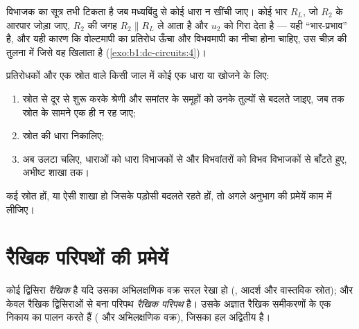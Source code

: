 \begin{remark}[विभाजक पर भार]\label{rem:b1:dc-circuits:loading}
विभाजक का सूत्र तभी टिकता है जब मध्यबिंदु से कोई धारा न खींची जाए।
कोई भार $R_L$, जो $R_2$ के आरपार जोड़ा जाए, $R_2$ की जगह $R_2
\parallel R_L$ ले आता है और $u_2$ को गिरा देता है --- यही ``भार-प्रभाव'' है,
और यही कारण कि वोल्टमापी का प्रतिरोध ऊँचा और विभवमापी का नीचा होना चाहिए, उस
चीज़ की तुलना में जिसे वह खिलाता है (\cref{exo:b1:dc-circuits:4})।
\end{remark}

\begin{method}[किसी जाल को समेटना]\label{met:b1:dc-circuits:reduce}
प्रतिरोधकों और एक स्रोत वाले किसी जाल में कोई एक धारा या  खोजने के
लिए:
\begin{enumerate}
  \item स्रोत से दूर से शुरू करके श्रेणी और समांतर के समूहों को उनके
        तुल्यों से बदलते जाइए, जब तक स्रोत के सामने एक ही  न रह
        जाए;
  \item स्रोत की धारा निकालिए;
  \item अब उलटा चलिए, धाराओं को धारा विभाजकों से और विभवांतरों को विभव
        विभाजकों से बाँटते हुए, अभीष्ट शाखा तक।
\end{enumerate}
कई स्रोत हों, या ऐसी शाखा हो जिसके पड़ोसी बदलते रहते हों, तो अगले अनुभाग की
प्रमेयें काम में लीजिए।
\end{method}

\section{रैखिक परिपथों की प्रमेयें}

\begin{definition}[रैखिक द्विसिरा, रैखिक परिपथ]\label{def:b1:dc-circuits:linear}
कोई द्विसिरा \emph{रैखिक} है यदि उसका अभिलक्षणिक वक्र सरल रेखा हो
(, आदर्श और वास्तविक स्रोत); और केवल रैखिक द्विसिराओं से बना परिपथ
\emph{रैखिक परिपथ} है। उसके अज्ञात रैखिक समीकरणों के एक निकाय का पालन करते
हैं ( और अभिलक्षणिक वक्र), जिसका हल अद्वितीय है।
\end{definition}

